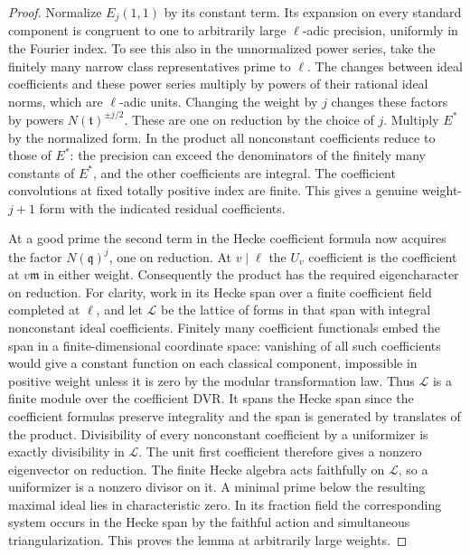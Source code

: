 \documentclass[a4paper,11pt]{article}
\theoremstyle{definition}
\theoremstyle{remark}
\numberwithin{equation}{section}
\begin{document}
\begin{proof}
Normalize \(E_j(1,1)\) by its constant term. Its expansion on
every standard component is congruent to one to arbitrarily
large \(\ell\)-adic precision, uniformly in the Fourier index.
To see this also in the unnormalized power series, take the
finitely many narrow class representatives prime to \(\ell\).
The changes between ideal coefficients and these power series
multiply by powers of their rational ideal norms, which are
\(\ell\)-adic units. Changing the weight by \(j\) changes
these factors by powers \(N(\mathfrak t)^{\pm j/2}\). These
are one on reduction by the choice of \(j\).
Multiply \(E^*\) by the normalized form. In the product all
nonconstant coefficients reduce to those of \(E^*\): the
precision can exceed the denominators of the finitely many
constants of \(E^*\), and the other coefficients are integral.
The coefficient convolutions at fixed totally positive index
are finite. This gives a genuine weight-\(j+1\) form with
the indicated residual coefficients.

At a good prime the second term in the Hecke coefficient
formula now acquires the factor \(N(\mathfrak q)^j\),
one on reduction. At \(v\mid\ell\) the \(U_v\) coefficient
is the coefficient at \(v\mathfrak m\) in either weight.
Consequently the product has the required eigencharacter on
reduction. For clarity, work in its Hecke span over a finite
coefficient field completed at \(\ell\), and let \(\mathcal L\)
be the lattice of forms in that span with integral nonconstant
ideal coefficients. Finitely many coefficient functionals
embed the span in a finite-dimensional coordinate space:
vanishing of all such coefficients would give a constant
function on each classical component, impossible in positive
weight unless it is zero by the modular transformation law.
Thus \(\mathcal L\) is a finite module over the coefficient
DVR. It spans the Hecke span since the coefficient formulas
preserve integrality and the span is generated by translates
of the product. Divisibility of every nonconstant coefficient
by a uniformizer is exactly divisibility in \(\mathcal L\).
The unit first coefficient therefore gives a nonzero
eigenvector on reduction. The finite Hecke algebra acts
faithfully on \(\mathcal L\), so a uniformizer is a nonzero
divisor on it. A minimal prime below the resulting maximal
ideal lies in characteristic zero. In its fraction field the
corresponding system occurs in the Hecke span by the faithful
action and simultaneous triangularization. This proves the
lemma at arbitrarily large weights.
\end{proof}
\end{document}

